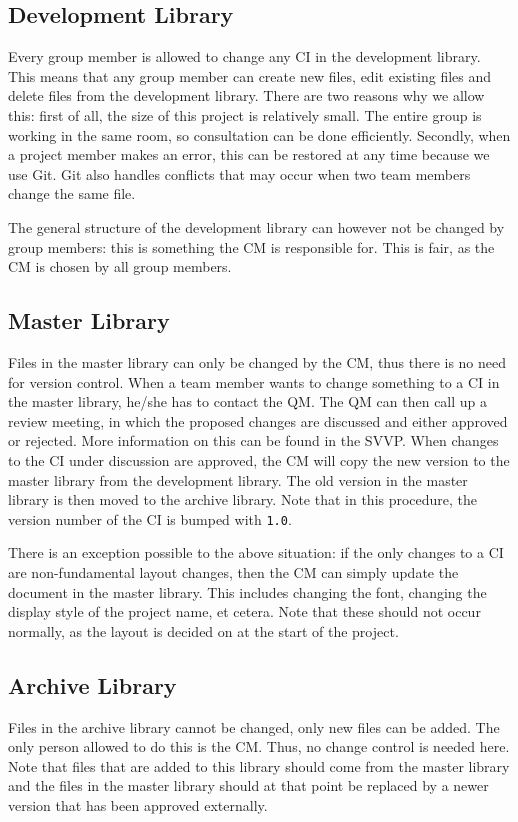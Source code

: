 \subsection{Development Library}
Every group member is allowed to change any CI in the development library. This means that any group member can create new files, edit existing files and delete files from the development library. There are two reasons why we allow this: first of all, the size of this project is relatively small. The entire group is working in the same room, so consultation can be done efficiently. Secondly, when a project member makes an error, this can be restored at any time because we use Git. Git also handles conflicts that may occur when two team members change the same file.

The general structure of the development library can however not be changed by group members: this is something the CM is responsible for. This is fair, as the CM is chosen by all group members.

\subsection{Master Library}
Files in the master library can only be changed by the CM, thus there is no need for version control. When a team member wants to change something to a CI in the master library, he/she has to contact the QM. The QM can then call up a review meeting, in which the proposed changes are discussed and either approved or rejected. More information on this can be found in the SVVP. When changes to the CI under discussion are approved, the CM will copy the new version to the master library from the development library. The old version in the master library is then moved to the archive library. Note that in this procedure, the version number of the CI is bumped with \texttt{1.0}.

There is an exception possible to the above situation: if the only changes to a CI are non-fundamental layout changes, then the CM can simply update the document in the master library. This includes changing the font, changing the display style of the project name, et cetera. Note that these should not occur normally, as the layout is decided on at the start of the project.

\subsection{Archive Library}
Files in the archive library cannot be changed, only new files can be added. The only person allowed to do this is the CM. Thus, no change control is needed here. Note that files that are added to this library should come from the master library and the files in the master library should at that point be replaced by a newer version that has been approved externally.
